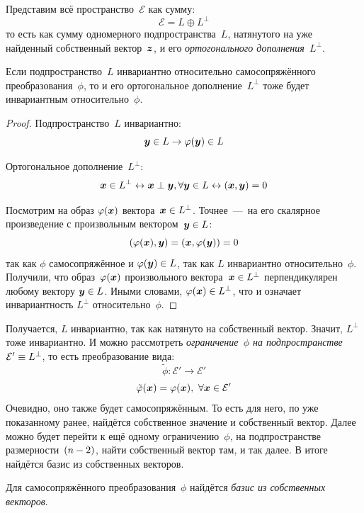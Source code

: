 \documentclass[a4paper,12pt]{article}
\theoremstyle{remark}
\begin{document}
  Представим всё пространство~$\mathcal E$ как сумму:
  \[
    \mathcal E = L \oplus L^{\perp}
  \]
  то есть как сумму одномерного подпространства~$L$, натянутого на уже найденный собственный вектор~$\boldsymbol z$, и его \emph{ортогонального дополнения~$L^{\perp}$}.
  
  \begin{proposition}
    Если подпространство~$L$ инвариантно относительно самосопряжённого преобразования~$\phi$, то и его ортогональное дополнение~$L^{\perp}$ тоже будет инвариантным относительно~$\phi$.
  \end{proposition}
  
  \begin{proof}
    Подпространство~$L$ инвариантно:
    \[
      \boldsymbol y \in L \rightarrow \varphi(\boldsymbol y) \in L
    \]
    
    Ортогональное дополнение~$L^{\perp}$:
    \[
      \boldsymbol x \in L^{\perp}
      \leftrightarrow \boldsymbol x \perp \boldsymbol y, \forall \boldsymbol y \in L
      \leftrightarrow (\boldsymbol x, \boldsymbol y) = 0
    \]
    
    Посмотрим на образ $\varphi(\boldsymbol x)$ вектора~$\bds x \hm\in L^{\perp}$.
    Точнее~---~на его скалярное произведение с произвольным вектором~$\bds y \hm\in L$:
    \[
      (\varphi(\boldsymbol x), \boldsymbol y) = (\boldsymbol x, \varphi(\boldsymbol y)) = 0
    \]
    так как $\phi$ самосопряжённое и $\phi(\bds y) \hm\in L$, так как $L$ инвариантно относительно~$\phi$.
    Получили, что образ~$\varphi(\boldsymbol x)$ произвольного вектора~$\bds x \hm\in L^{\perp}$ перпендикулярен любому вектору $\bds y \hm\in L$.
    Иными словами, $\phi(\bds x) \hm\in L^{\perp}$, что и означает инвариантность $L^{\perp}$ относительно~$\phi$.
  \end{proof}
  
  Получается, $L$ инвариантно, так как натянуто на собственный вектор.
  Значит, $L^{\perp}$ тоже инвариантно.
  И можно рассмотреть \emph{ограничение~$\phi$ на подпространстве~$\mathcal E' \hm\equiv L^{\perp}$}, то есть преобразование вида:
  \[
    \tilde\phi\colon \mathcal E' \to \mathcal E'
  \]
  \[
    \tilde{\varphi}(\boldsymbol x) = \varphi(\boldsymbol x),\ \forall \boldsymbol x \in \mathcal E'
  \]
  Очевидно, оно также будет самосопряжённым.
  То есть для него, по уже показанному ранее, найдётся собственное значение и собственный вектор.
  Далее можно будет перейти к ещё одному ограничению~$\phi$, на подпространстве размерности~$(n \hm- 2)$, найти собственный вектор там, и так далее.
  В итоге найдётся базис из собственных векторов.
  
  \begin{theorem}\label{theo:basis-exists}
    Для самосопряжённого преобразования~$\phi$ найдётся \emph{базис из собственных векторов}.
  \end{theorem}
\end{document}
